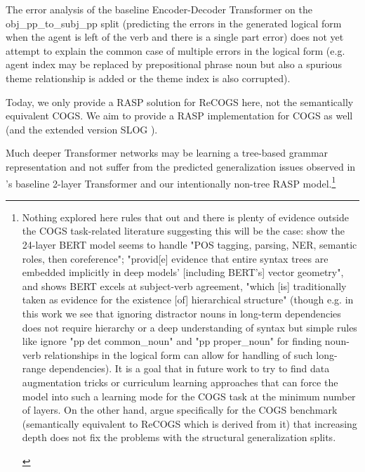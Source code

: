 \documentclass[11pt]{article}
\begin{document}
The error analysis of the \cite{Wu2023} baseline Encoder-Decoder Transformer on the obj\_pp\_to\_subj\_pp split (predicting the errors in the generated logical form when the agent is left of the verb and there is a single part error) does not yet attempt to explain the common case of multiple errors in the logical form (e.g. agent index may be replaced by prepositional phrase noun but also a spurious theme relationship is added or the theme index is also corrupted).

Today, we only provide a RASP solution for ReCOGS \cite{Wu2023} here, not the semantically equivalent COGS. We aim to provide a RASP implementation for COGS as well (and the extended version SLOG \cite{li2023slogstructuralgeneralizationbenchmark}).

Much deeper Transformer networks may be learning a tree-based grammar representation and not suffer from the predicted generalization issues observed in \cite{Wu2023}'s baseline 2-layer Transformer and our intentionally non-tree RASP model.\footnote{
\begin{tiny}
Nothing explored here rules that out and there is plenty of evidence outside the COGS task-related literature suggesting this will be the case: \cite{tenney2019bertrediscoversclassicalnlp} show the 24-layer BERT model seems to handle "POS tagging, parsing, NER, semantic roles, then coreference"; \cite{hewitt-manning-2019-structural} "provid[e] evidence that entire syntax trees are embedded implicitly in deep models’ [including BERT's] vector geometry", and \cite{goldberg2019assessingbertssyntacticabilities} shows BERT excels at subject-verb agreement, "which [is] traditionally taken as evidence for
the existence [of] hierarchical structure" (though e.g. in this work we see that ignoring distractor nouns in long-term dependencies does not require hierarchy or a deep understanding of syntax but simple rules like ignore "pp det common\_noun" and "pp proper\_noun" for finding noun-verb relationships in the logical form can allow for handling of such long-range dependencies). It is a goal that in future work to try to find data augmentation tricks or curriculum learning approaches that can force the model into such a learning mode for the COGS task at the minimum number of layers. On the other hand, \cite{petty2024impactdepthcompositionalgeneralization} argue specifically for the COGS benchmark (semantically equivalent to ReCOGS which is derived from it) that increasing depth does not fix the problems with the structural generalization splits.
\end{tiny}
}
\end{document}
